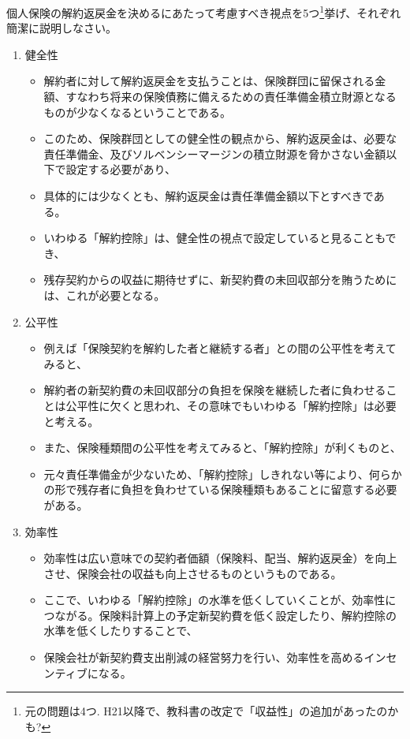 \documentclass[report,gutter=10mm,fore-edge=10mm,uplatex,dvipdfmx]{jlreq}
\begin{document}
個人保険の解約返戻金を決めるにあたって考慮すべき視点を5つ\footnote{元の問題は4つ. H21以降で、教科書の改定で「収益性」の追加があったのかも? }挙げ、それぞれ簡潔に説明しなさい。
\begin{enumerate}
\item 健全性
  \begin{itemize}
  \item 解約者に対して解約返戻金を支払うことは、保険群団に留保される金額、すなわち将来の保険債務に備えるための責任準備金積立財源となるものが少なくなるということである。
  \item このため、保険群団としての健全性の観点から、解約返戻金は、必要な責任準備金、及びソルベンシーマージンの積立財源を脅かさない金額以下で設定する必要があり、
  \item 具体的には少なくとも、解約返戻金は責任準備金額以下とすべきである。
  \item いわゆる「解約控除」は、健全性の視点で設定していると見ることもでき、
  \item 残存契約からの収益に期待せずに、新契約費の未回収部分を賄うためには、これが必要となる。
  \end{itemize}
\item 公平性
  \begin{itemize}
  \item 例えば「保険契約を解約した者と継続する者」との間の公平性を考えてみると、
  \item 解約者の新契約費の未回収部分の負担を保険を継続した者に負わせることは公平性に欠くと思われ、その意味でもいわゆる「解約控除」は必要と考える。
  \item また、保険種類間の公平性を考えてみると、「解約控除」が利くものと、
  \item 元々責任準備金が少ないため、「解約控除」しきれない等により、何らかの形で残存者に負担を負わせている保険種類もあることに留意する必要がある。
  \end{itemize}
\item 効率性
  \begin{itemize}
  \item 効率性は広い意味での契約者価額（保険料、配当、解約返戻金）を向上させ、保険会社の収益も向上させるものというものである。
  \item ここで、いわゆる「解約控除」の水準を低くしていくことが、効率性につながる。保険料計算上の予定新契約費を低く設定したり、解約控除の水準を低くしたりすることで、
  \item 保険会社が新契約費支出削減の経営努力を行い、効率性を高めるインセンティブになる。

\end{itemize}
\end{enumerate}
\end{document}
